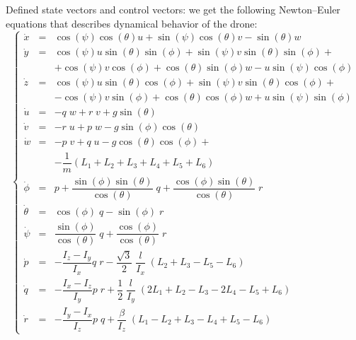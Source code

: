 Defined state vectors and control vectors:
we get the following Newton--Euler equations that describes dynamical behavior of the drone:
\begin{equation}
\left\{\begin{array}{rcl}
\dot{x} &=&\cos ( \psi) \cos ( \theta) u +\sin ( \psi) \cos ( \theta) v -\sin ( \theta) w \\
\dot{y} &=& \cos ( \psi ) u \sin ( \theta ) \sin ( \phi) +\sin( \psi) v \sin ( \theta) \sin ( \phi ) + \\ & &  +\cos ( \psi) v  \cos ( \phi) +\cos ( \theta) \sin ( \phi ) w -u \sin ( \psi) \cos ( \phi) \\
\dot{z} & = &\cos ( \psi) u \sin ( \theta ) \cos ( \phi) +\sin( \psi) v \sin ( \theta) \cos ( \phi ) + \\ & & -\cos ( \psi) v  \sin ( \phi) +\cos (\theta) \cos ( \phi ) w +u \sin ( \psi) \sin ( \phi) \\
\dot{u} & = & - q\;w + r\;v + g \sin(\theta) \\
\dot{v} & = & - r\;u + p\;w - g \sin(\phi) \cos(\theta) \\
\dot{w} & = & - p\;v + q\;u - g \cos(\theta) \cos(\phi) + \\ & &-\dfrac{1}{m} \left(L_1 + L_2 + L_3 + L_4 + L_5 + L_6 \right) \\

\dot{\phi} & = & p + \dfrac{\sin(\phi) \sin(\theta)}{\cos(\theta)}\;q + \dfrac{\cos(\phi) \sin(\theta)}{\cos(\theta)}\;r \\
\dot{\theta} & = & \cos(\phi)\;q - \sin(\phi)\;r \\
\dot{\psi} & = & \dfrac{\sin(\phi)}{\cos(\theta)}\;q + \dfrac{\cos(\phi)}{\cos(\theta)}\;r \\
\dot{p} & = & -\dfrac{I_z-I_y}{I_x} q\;r -\dfrac{\sqrt{3}}{2}\;\dfrac{l}{I_x}\;\left( L_2 +L_3 - L_5 - L_6 \right) \\
\dot{q} & = & -\dfrac{I_x-I_z}{I_y} p\;r + \dfrac{1}{2}\;\dfrac{l}{I_y}\;\left( 2 L_1 + L_2 -L_3 - 2 L_4 - L_5 + L_6 \right) \\
\dot{r} & = & -\dfrac{I_y-I_x}{I_z} p\;q + \dfrac{\beta}{I_z}\;\left( L_1 - L_2 + L_3 - L_4 + L_5 - L_6 \right)
\end{array}\right.
\end{equation}
